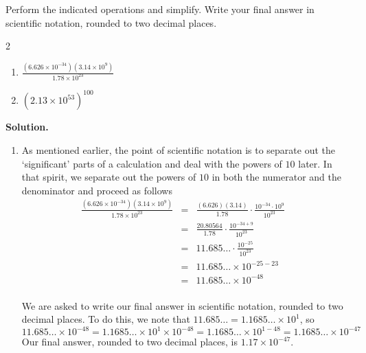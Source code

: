\documentclass{ximera}
\begin{document}
\begin{example} \label{scientificnotationex} Perform the indicated operations and simplify.  Write your final answer in scientific notation, rounded to two decimal places.

\begin{multicols}{2}

\begin{enumerate}

\item  $\frac{\left(6.626 \times 10^{-34} \right) \left(3.14 \times 10^{9}\right)}{1.78 \times 10^{23}}$

\item  $\left(2.13 \times 10^{53}\right)^{100}$

\end{enumerate}

\end{multicols}

{\bf Solution.}

\begin{enumerate}

\item  As mentioned earlier, the point of scientific notation is to separate out the `significant' parts of a calculation and deal with the powers of $10$ later.  In that spirit, we separate out the powers of $10$ in both the numerator and the denominator and proceed as follows \[ \begin{array}{rclr}

\frac{\left(6.626 \times 10^{-34} \right) \left(3.14 \times 10^{9}\right)}{1.78 \times 10^{23}} & = & \frac{(6.626)(3.14)}{1.78} \cdot \frac{10^{-34} \cdot 10^{9}}{10^{23}} & \\ 
& = & \frac{20.80564}{1.78} \cdot \frac{10^{-34 + 9}}{10^{23}} & \\  
& = & 11.685 \ldots \cdot \frac{10^{-25}}{10^{23}} & \\  
& = & 11.685 \ldots \times 10^{-25-23} & \\
& = & 11.685 \ldots \times 10^{-48} & \\
\end{array} \]

We are asked to write our final answer in scientific notation, rounded to two decimal places.  To do this, we note that  $11.685 \ldots = 1.1685 \ldots \times 10^{1}$, so\[ 11.685 \ldots \times 10^{-48} = 1.1685 \ldots \times 10^{1} \times 10^{-48} = 1.1685 \ldots \times 10^{1-48} = 1.1685 \ldots \times 10^{-47} \] Our final answer, rounded to two decimal places, is $1.17 \times 10^{-47}$.  


\end{enumerate}
\end{example}
\end{document}
